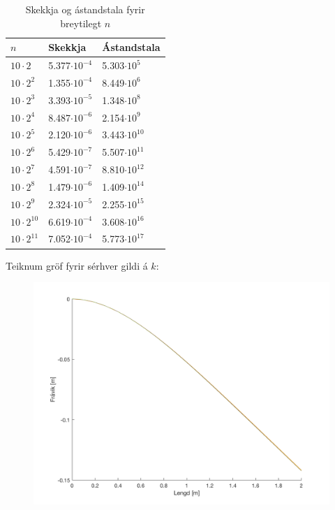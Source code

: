 \documentclass[11pt]{article}
\begin{document}
{\begin{table}[H]
\begin{center}
\caption{Skekkja og ástandstala fyrir breytilegt $n$}
\begin{tabular}{l | l| l}
$n$ & Skekkja & Ástandstala\\
\hline
$10\cdot 2$			& 5.377$\cdot 10^{-4}$	& 5.303$\cdot 10^{5}$	\\
$10\cdot 2^2$		& 1.355$\cdot 10^{-4}$	& 8.449$\cdot 10^{6}$	\\
$10\cdot 2^3$		& 3.393$\cdot 10^{-5}$	& 1.348$\cdot 10^{8}$	\\
$10\cdot 2^4$		& 8.487$\cdot 10^{-6}$	& 2.154$\cdot 10^{9}$	\\
$10\cdot 2^5$		& 2.120$\cdot 10^{-6}$	& 3.443$\cdot 10^{10}$	\\
$10\cdot 2^6$		& 5.429$\cdot 10^{-7}$	& 5.507$\cdot 10^{11}$ \\
$10\cdot 2^7$		& 4.591$\cdot 10^{-7}$	& 8.810$\cdot 10^{12}$ \\    
$10\cdot 2^8$		& 1.479$\cdot 10^{-6}$	& 1.409$\cdot 10^{14}$	\\
$10\cdot 2^9$		& 2.324$\cdot 10^{-5}$	& 2.255$\cdot 10^{15}$	\\
$10\cdot 2^{10}$	& 6.619$\cdot 10^{-4}$	& 3.608$\cdot 10^{16}$	\\
$10\cdot 2^{11}$	& 7.052$\cdot 10^{-4}$	& 5.773$\cdot 10^{17}$	\\
\end{tabular}
\end{center}
\end{table}
\newpage
Teiknum gröf fyrir sérhver gildi á $k$:
\begin{figure}[H]
\centering
  \includegraphics[width=5in]{bretti_m_hrugu.png}

\end{figure}}
\end{document}

